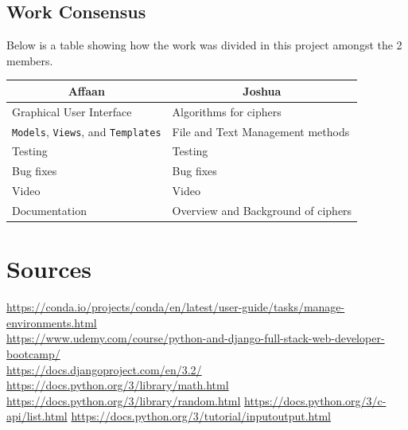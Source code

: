 \documentclass[a4paper, 12pt, titlepage]{report}
\begin{document}
\section{Work Consensus}
Below is a table showing how the work was divided in this project amongst the 2 members.
\begin{table}[H]
\centering
\begin{tabular}{@{}ll@{}}
\toprule
\multicolumn{1}{c}{Affaan}   & \multicolumn{1}{c}{Joshua}         \\ \midrule
Graphical User Interface     & Algorithms for ciphers             \\
\texttt{Models}, \texttt{Views}, and \texttt{Templates} & File and Text Management methods            \\
Testing                      & Testing                            \\
Bug fixes                    & Bug fixes                          \\
Video                        & Video                              \\
Documentation                & Overview and Background of ciphers \\ \bottomrule
\end{tabular}
\end{table}
\chapter{Sources}
\url{https://conda.io/projects/conda/en/latest/user-guide/tasks/manage-environments.html}\\
\url{https://www.udemy.com/course/python-and-django-full-stack-web-developer-bootcamp/}\\
\url{https://docs.djangoproject.com/en/3.2/}
\url{https://docs.python.org/3/library/math.html}
\url{https://docs.python.org/3/library/random.html}
\url{https://docs.python.org/3/c-api/list.html}
\url{https://docs.python.org/3/tutorial/inputoutput.html}
\end{document}
